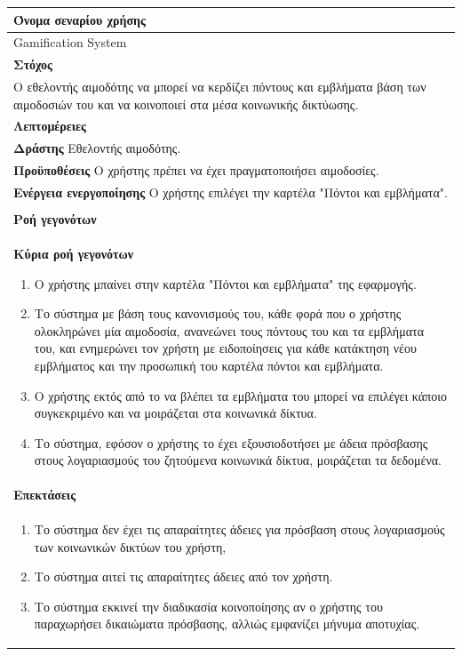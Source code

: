 \begin{center}
    \begin{tabular}{|p{\dimexpr \linewidth-2\tabcolsep}|}
    \hline
    \rowcolor{grayy}
    \textbf{Όνομα σεναρίου χρήσης}
    \\ \hline    
     Gamification System
     \\ \hline
    \rowcolor{grayy}
    \textbf{\textbf{Στόχος}}
    \\ \hline
 	 Ο εθελοντής αιμοδότης να μπορεί να κερδίζει πόντους και εμβλήματα βάση των αιμοδοσιών του και να κοινοποιεί στα μέσα κοινωνικής δικτύωσης.
    \\ \hline
    \rowcolor{grayy}
    \textbf{Λεπτομέρειες}
    \\ \hline
	\textbf{Δράστης} Εθελοντής αιμοδότης.
	\\*
	\textbf{Προϋποθέσεις} Ο χρήστης πρέπει να έχει πραγματοποιήσει αιμοδοσίες.
	\\*
	\textbf{Ενέργεια ενεργοποίησης} Ο χρήστης επιλέγει την καρτέλα "Πόντοι και εμβλήματα".
	\\ \hline
    \\ \hline
	\rowcolor{grayy}    
    \textbf{Ροή γεγονότων}
    \\* 
	\textbf{Κύρια ροή γεγονότων}
	\begin{enumerate}
	\item	 Ο χρήστης μπαίνει  στην καρτέλα "Πόντοι και εμβλήματα" της εφαρμογής.
	\item  Το σύστημα με βάση τους κανονισμούς του, κάθε φορά που ο χρήστης ολοκληρώνει μία αιμοδοσία, ανανεώνει τους πόντους του και τα εμβλήματα του, και ενημερώνει τον χρήστη με ειδοποίησεις για κάθε κατάκτηση νέου εμβλήματος και την προσωπική του καρτέλα πόντοι και εμβλήματα.
	\item Ο χρήστης εκτός από το να βλέπει τα εμβλήματα του μπορεί να επιλέγει κάποιο συγκεκριμένο και να μοιράζεται στα κοινωνικά δίκτυα.
	\item Το σύστημα, εφόσον ο χρήστης το έχει εξουσιοδοτήσει με άδεια πρόσβασης στους λογαριασμούς του ζητούμενα κοινωνικά δίκτυα, μοιράζεται τα δεδομένα.
	\end{enumerate}
	\\*
	\textbf{Επεκτάσεις}
	   \\ \hline
	   	   \begin{enumerate}
	\item Το σύστημα δεν έχει τις απαραίτητες άδειες για πρόσβαση στους λογαριασμούς των κοινωνικών δικτύων του χρήστη,
	\item Το σύστημα αιτεί τις απαραίτητες άδειες από τον χρήστη.
	\item Το σύστημα εκκινεί την διαδικασία κοινοποίησης αν ο χρήστης του παραχωρήσει δικαιώματα πρόσβασης, αλλιώς εμφανίζει μήνυμα αποτυχίας.
	\end{enumerate}
	\\ \hline
    \end{tabular}
\end{center}	


